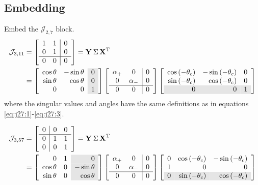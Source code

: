 \subsection{Embedding}
Embed the $\mathcal{J}_{2,7}$ block.
\begin{equation}
  \begin{split}
    \mathcal{J}_{3,11} &= 
\mat{cc|c}
{
                1 & 1 & 0 \\
                0 & 1 & 0 \\\hline
                0 & 0 & 0
}   = \svd{T}\\
   &=
\mat{rr>{\columncolor{ltgray}}r}
{
                \cos\theta & -\sin\theta & 0 \\
                \sin\theta &  \cos\theta & 0 \\
                0 & 0 & 1
}
\mat{cc|c}
{                
            \alpha_{+} & 0 & 0 \\
            0 & \alpha_{-} & 0 \\\hline
            0 & 0 & 0
}%
\mat{rrr}
{                
                 \cos\paren{-\theta_{c}} &  -\sin\paren{-\theta_{c}} & 0 \\
                 \sin\paren{-\theta_{c}} &   \cos\paren{-\theta_{c}} & 0 \\
\rowcolor{ltgray}
                0 & 0 & 1
}
  \end{split}
\end{equation}
where the singular values and angles have the same definitions as in equations \eqref{eq:j27:1}-\eqref{eq:j27:3}.

\begin{equation}
  \begin{split}
    \mathcal{J}_{3,57} &= 
\mat{c|cc}
{
                0 & 0 & 0 \\\hline
                0 & 1 & 1 \\
                0 & 0 & 1
}   = \svd{T}\\
   &=
\mat{rr>{\columncolor{ltgray}}r}
{
                0 & 1 & 0\\
                \cos\theta & 0 & -\sin\theta \\
                \sin\theta & 0 &  \cos\theta \\
}
\mat{cc|c}
{                
            \alpha_{+} & 0 & 0 \\
            0 & \alpha_{-} & 0 \\\hline
            0 & 0 & 0
}%
\mat{rrr}
{                
                0 & \cos\paren{-\theta_{c}} & -\sin\paren{-\theta_{c}}\\
                1 & 0 & 0 \\
\rowcolor{ltgray}
                0 & \sin\paren{-\theta_{c}} & \cos\paren{-\theta_{c}} \\
}
  \end{split}
\end{equation}

